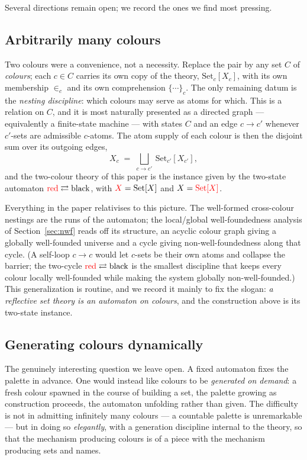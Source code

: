 Several directions remain open; we record the ones we find most pressing.

\subsection{Arbitrarily many colours}
\label{sec:future:palette}

Two colours were a convenience, not a necessity. Replace the pair by any set $C$
of \emph{colours}; each $c\in C$ carries its own copy of the theory,
$\mathrm{Set}_c[X_c]$, with its own membership $\in_c$ and its own comprehension
$\{\cdots\}_c$. The only remaining datum is the \emph{nesting discipline}: which
colours may serve as atoms for which. This is a relation on $C$, and it is most
naturally presented as a directed graph --- equivalently a finite-state machine
--- with states $C$ and an edge $c\to c'$ whenever $c'$-sets are admissible
$c$-atoms. The atom supply of each colour is then the disjoint sum over its
outgoing edges,
\[
  X_c \;=\; \bigsqcup_{c\to c'}\ \mathrm{Set}_{c'}[X_{c'}],
\]
and the two-colour theory of this paper is the instance given by the two-state
automaton $\textcolor{red}{\mathrm{red}} \rightleftarrows \textcolor{black}{\mathrm{black}}$, with
$\textcolor{red}{X}=\textcolor{black}{\mathrm{Set}[X]}$ and $\textcolor{black}{X}=\textcolor{red}{\mathrm{Set}[X]}$.

Everything in the paper relativises to this picture. The well-formed cross-colour
nestings are the runs of the automaton; the local/global well-foundedness analysis
of Section~\ref{sec:nwf} reads off its structure, an acyclic colour graph giving a
globally well-founded universe and a cycle giving non-well-foundedness along that
cycle. (A self-loop $c\to c$ would let $c$-sets be their own atoms and collapse
the barrier; the two-cycle $\textcolor{red}{\mathrm{red}}\rightleftarrows\textcolor{black}{\mathrm{black}}$
is the smallest discipline that keeps every colour locally well-founded while
making the system globally non-well-founded.) This generalization is routine, and
we record it mainly to fix the slogan: \emph{a reflective set theory is an
automaton on colours}, and the construction above is its two-state instance.

\subsection{Generating colours dynamically}
\label{sec:future:dynamic}

The genuinely interesting question we leave open. A fixed automaton fixes the
palette in advance. One would instead like colours to be \emph{generated on
demand}: a fresh colour spawned in the course of building a set, the palette
growing as construction proceeds, the automaton unfolding rather than given. The
difficulty is not in admitting infinitely many colours --- a countable palette is
unremarkable --- but in doing so \emph{elegantly}, with a generation discipline
internal to the theory, so that the mechanism producing colours is of a piece with
the mechanism producing sets and names.

